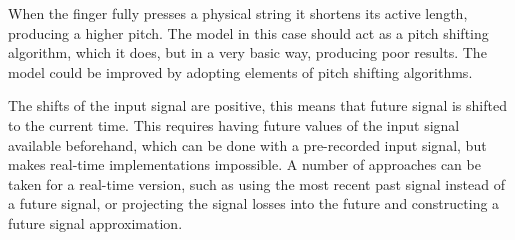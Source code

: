 \documentclass{sigchi}
\begin{document}
When the finger fully presses a physical string it shortens its active length, producing a higher pitch.
The model in this case should act as a pitch shifting algorithm, which it does, but in a very basic way, producing poor results.
The model could be improved by adopting elements of pitch shifting algorithms.

The shifts of the input signal are positive, this means that future signal is shifted to the current time.
This requires having future values of the input signal available beforehand, which can be done with a pre-recorded input signal, but makes real-time implementations impossible.
A number of approaches can be taken for a real-time version, such as using the most recent past signal instead of a future signal, or projecting the signal losses into the future and constructing a future signal approximation.



\end{document}
